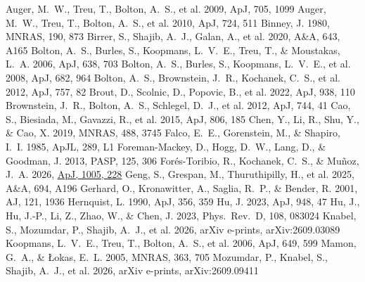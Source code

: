 \documentclass{aa}
\providecommand{\aap}{A\&A}
\providecommand{\apj}{ApJ}
\providecommand{\apjl}{ApJL}
\providecommand{\aj}{AJ}
\providecommand{\mnras}{MNRAS}
\providecommand{\prd}{Phys.~Rev.~D}
\providecommand{\pasp}{PASP}
\begin{document}
\begin{thebibliography}{}

 Auger, M.~W., Treu, T., Bolton, A.~S., et al. 2009, \apj, 705, 1099
 Auger, M.~W., Treu, T., Bolton, A.~S., et al. 2010, \apj, 724, 511
 Binney, J. 1980, \mnras, 190, 873
 Birrer, S., Shajib, A.~J., Galan, A., et al. 2020, \aap, 643, A165
 Bolton, A.~S., Burles, S., Koopmans, L.~V.~E., Treu, T., \& Moustakas, L.~A. 2006, \apj, 638, 703
 Bolton, A.~S., Burles, S., Koopmans, L.~V.~E., et al. 2008, \apj, 682, 964
 Bolton, A.~S., Brownstein, J.~R., Kochanek, C.~S., et al. 2012, \apj, 757, 82
 Brout, D., Scolnic, D., Popovic, B., et al. 2022, \apj, 938, 110
 Brownstein, J.~R., Bolton, A.~S., Schlegel, D.~J., et al. 2012, \apj, 744, 41
 Cao, S., Biesiada, M., Gavazzi, R., et al. 2015, \apj, 806, 185
 Chen, Y., Li, R., Shu, Y., \& Cao, X. 2019, \mnras, 488, 3745
 Falco, E.~E., Gorenstein, M., \& Shapiro, I.~I. 1985, \apjl, 289, L1
 Foreman-Mackey, D., Hogg, D.~W., Lang, D., \& Goodman, J. 2013, \pasp, 125, 306
 For\'es-Toribio, R., Kochanek, C.~S., \& Mu\~noz, J.~A. 2026, \href{https://doi.org/10.3847/1538-4357/ae78c3}{\apj, 1005, 228}
 Geng, S., Grespan, M., Thuruthipilly, H., et al. 2025, \aap, 694, A196
 Gerhard, O., Kronawitter, A., Saglia, R.~P., \& Bender, R. 2001, \aj, 121, 1936
 Hernquist, L. 1990, \apj, 356, 359
 Hu, J. 2023, \apj, 948, 47
 Hu, J., Hu, J.-P., Li, Z., Zhao, W., \& Chen, J. 2023, \prd, 108, 083024
 Knabel, S., Mozumdar, P., Shajib, A.~J., et al. 2026, arXiv e-prints, arXiv:2609.03089
 Koopmans, L.~V.~E., Treu, T., Bolton, A.~S., et al. 2006, \apj, 649, 599
 Mamon, G.~A., \& \L{}okas, E.~L. 2005, \mnras, 363, 705
 Mozumdar, P., Knabel, S., Shajib, A.~J., et al. 2026, arXiv e-prints, arXiv:2609.09411

\end{thebibliography}
\end{document}
